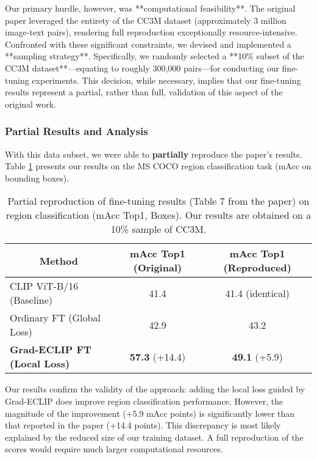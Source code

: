 \documentclass[10pt]{article} %
\begin{document}
Our primary hurdle, however, was **computational feasibility**. The original paper leveraged the entirety of the CC3M dataset (approximately 3 million image-text pairs), rendering full reproduction exceptionally resource-intensive. Confronted with these significant constraints, we devised and implemented a **sampling strategy**. Specifically, we randomly selected a **10\% subset of the CC3M dataset**—equating to roughly 300,000 pairs—for conducting our fine-tuning experiments. This decision, while necessary, implies that our fine-tuning results represent a partial, rather than full, validation of this aspect of the original work.

\subsubsection{Partial Results and Analysis}
With this data subset, we were able to \textbf{partially} reproduce the paper's results. Table \ref{table:finetuning-repro} presents our results on the MS COCO region classification task (mAcc on bounding boxes).

\begin{table}[t]
\caption{Partial reproduction of fine-tuning results (Table 7 from the paper) on region classification (mAcc Top1, Boxes). Our results are obtained on a 10\% sample of CC3M.}
\label{table:finetuning-repro}
\begin{center}
\begin{tabular}{lcc}
\toprule
\multicolumn{1}{c}{\bf Method} & \bf mAcc Top1 (Original) & \bf mAcc Top1 (Reproduced) \\
\midrule
CLIP ViT-B/16 (Baseline) & 41.4 & 41.4 (identical) \\
Ordinary FT (Global Loss) & 42.9 & 43.2 \\
\textbf{Grad-ECLIP FT (Local Loss)} & \textbf{57.3} (+14.4) & \textbf{49.1} (+5.9) \\
\bottomrule
\end{tabular}
\end{center}
\end{table}

Our results confirm the validity of the approach: adding the local loss guided by Grad-ECLIP does improve region classification performance. However, the magnitude of the improvement (+5.9 mAcc points) is significantly lower than that reported in the paper (+14.4 points). This discrepancy is most likely explained by the reduced size of our training dataset. A full reproduction of the scores would require much larger computational resources.
\end{document}
